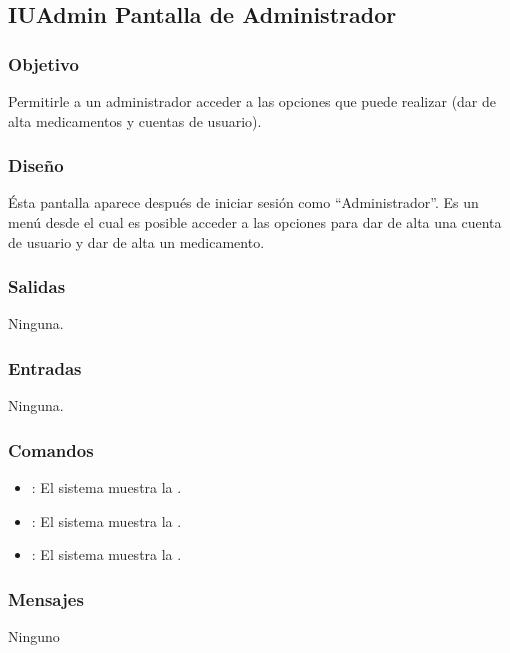 \subsection{IUAdmin Pantalla de Administrador}

\subsubsection{Objetivo}
	Permitirle a un administrador acceder a las opciones que puede realizar (dar de alta medicamentos y cuentas de usuario).

\subsubsection{Diseño}
	\'Esta pantalla aparece despu\'es de iniciar sesi\'on como "`Administrador"'. Es un men\'u desde el cual es posible acceder a las opciones para dar de alta una cuenta de usuario y dar de alta un medicamento.


\subsubsection{Salidas}

	Ninguna.

\subsubsection{Entradas}
	Ninguna.

\subsubsection{Comandos}
\begin{itemize}
		\item {} : El sistema muestra la \label{IUAddMed}.
		\item {} : El sistema muestra la \label{IUAddUsr}.
		\item {} : El sistema muestra la \label{IULogin}.
\end{itemize}

\subsubsection{Mensajes}
	\begin{Citemize}
		Ninguno
	\end{Citemize}